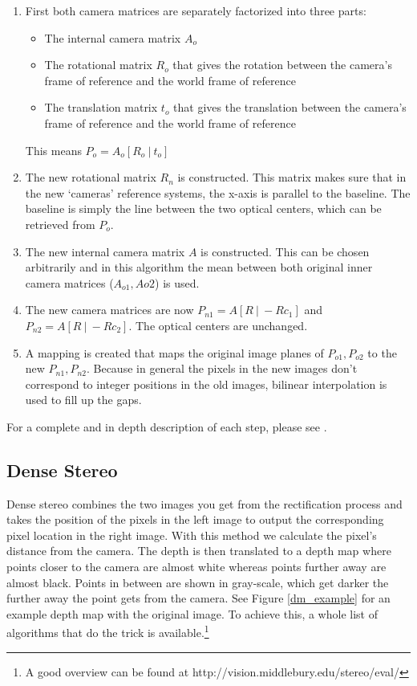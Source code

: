\documentclass[a4paper]{article}
\begin{document}
\begin{enumerate}
  \item First both camera matrices are separately factorized into three parts:
  \begin{itemize}
    \item The internal camera matrix $A_o$
    \item The rotational matrix $R_o$ that gives the rotation between the camera's
    frame of reference and the world frame of reference
    \item The translation matrix $t_o$ that gives the translation between the
    camera's frame of reference and the world frame of reference
  \end{itemize}
  This means $P_o = A_o[R_o\ |\ t_o]$
  \item The new rotational matrix $R_n$ is constructed. This matrix makes
  sure that in the new `cameras' reference systems, the x-axis is parallel
  to the baseline. The baseline is simply the line between the two optical
  centers, which can be retrieved from $P_o$.
  \item The new internal camera matrix $A$ is constructed. This can be
  chosen arbitrarily and in this algorithm the mean between both original
  inner camera matrices ($A_{o1}, A{o2}$) is used.
  \item The new camera matrices are now $P_{n1} = A[R\ |\ -R c_1]$ and
  $P_{n2}
  = A[R\ |\ -R c_2]$. The optical centers are unchanged.
  \item A mapping is created that maps the original image planes of $P_{o1},
  P_{o2}$ to the new $P_{n1}, P_{n2}$. Because in general the pixels in the new
  images don't correspond to integer positions in the old images, bilinear
  interpolation is used to fill up the gaps.
\end{enumerate}

For a complete and in depth description of each step, please see
\cite{fusiello2000}.

\subsection{Dense Stereo} 
\label{theory}
Dense stereo combines the two images you get from the rectification process and
takes the position of the pixels in the left image to output the corresponding
pixel location in the right image. With this method we calculate the pixel's
distance from the camera.  The depth is then translated to a depth map where
points closer to the camera are almost white whereas points further away are
almost black. Points in between are shown in gray-scale, which get darker the
further away the point gets from the camera. See Figure \ref{dm_example} for an
example depth map with the original image. To achieve this, a whole list of
algorithms that do the trick is available.\footnote{A good overview can be found
at http://vision.middlebury.edu/stereo/eval/}
\end{document}
